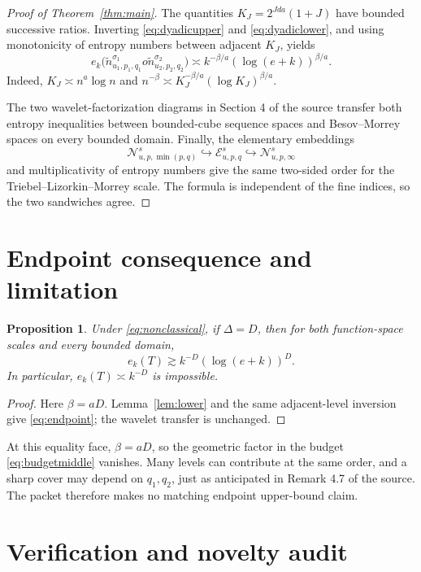 \documentclass[11pt]{article}
\newtheorem{proposition}[theorem]{Proposition}
\begin{document}
\begin{proof}[Proof of Theorem~\ref{thm:main}]
The quantities $K_J=2^{Jda}(1+J)$ have bounded successive ratios.  Inverting
\eqref{eq:dyadicupper} and \eqref{eq:dyadiclower}, and using monotonicity of
entropy numbers between adjacent $K_J$, yields
\[
 e_k\big(\widetilde n^{\sigma_1}_{u_1,p_1,q_1}	o
          \widetilde n^{\sigma_2}_{u_2,p_2,q_2}\big)
 \asymp k^{-\beta/a}(\log(e+k))^{\beta/a}.
\]
Indeed, $K_J\asymp n^a\log n$ and
$n^{-\beta}\asymp K_J^{-\beta/a}(\log K_J)^{\beta/a}$.

The two wavelet-factorization diagrams in Section 4 of the source transfer
both entropy inequalities between bounded-cube sequence spaces and
Besov--Morrey spaces on every bounded domain.  Finally, the elementary
embeddings
\[
 \mathcal N^s_{u,p,\min(p,q)}
 \hookrightarrow\mathcal E^s_{u,p,q}
 \hookrightarrow\mathcal N^s_{u,p,\infty}
\]
and multiplicativity of entropy numbers give the same two-sided order for
the Triebel--Lizorkin--Morrey scale.  The formula is independent of the fine
indices, so the two sandwiches agree.
\end{proof}

\section{Endpoint consequence and limitation}

\begin{proposition}\label{prop:endpoint}
Under \eqref{eq:nonclassical}, if $\Delta=D$, then for both function-space
scales and every bounded domain,
\begin{equation}\label{eq:endpoint}
 e_k(T)\gtrsim k^{-D}(\log(e+k))^D.
\end{equation}
In particular, $e_k(T)\asymp k^{-D}$ is impossible.
\end{proposition}

\begin{proof}
Here $\beta=aD$.  Lemma~\ref{lem:lower} and the same adjacent-level
inversion give \eqref{eq:endpoint}; the wavelet transfer is unchanged.
\end{proof}

At this equality face, $\beta=aD$, so the geometric factor in the budget
\eqref{eq:budgetmiddle} vanishes.  Many levels can contribute at the same
order, and a sharp cover may depend on $q_1,q_2$, just as anticipated in
Remark 4.7 of the source.  The packet therefore makes no matching endpoint
upper-bound claim.

\section{Verification and novelty audit}
\end{document}
